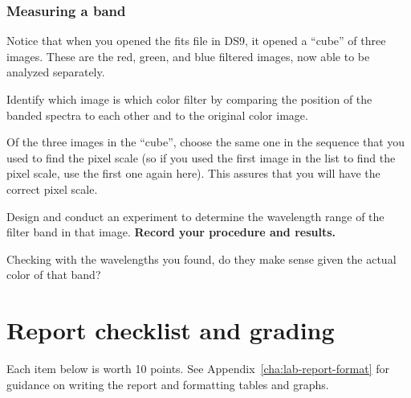 \subsubsection{Measuring a band}

Notice that when you opened the fits file in DS9, it opened a ``cube'' of three images. These are the red, green, and blue filtered images, now able to be analyzed separately.

\begin{steps}
	\item Identify which image is which color filter by comparing the position of the banded spectra to each other and to the original color image.
	
	\item Of the three images in the ``cube'', choose the same one in the sequence that you used to find the pixel scale (so if you used the first image in the list to find the pixel scale, use the first one again here). This assures that you will have the correct pixel scale.
	
	\item Design and conduct an experiment to determine the wavelength range of the filter band in that image. \textbf{Record your procedure and results.}
	
	\item Checking with the wavelengths you found, do they make sense given the actual color of that band?
\end{steps}

\section{Report checklist and grading}

Each item below is worth 10 points. See Appendix\ \ref{cha:lab-report-format} for guidance on writing the report and formatting tables and graphs.

